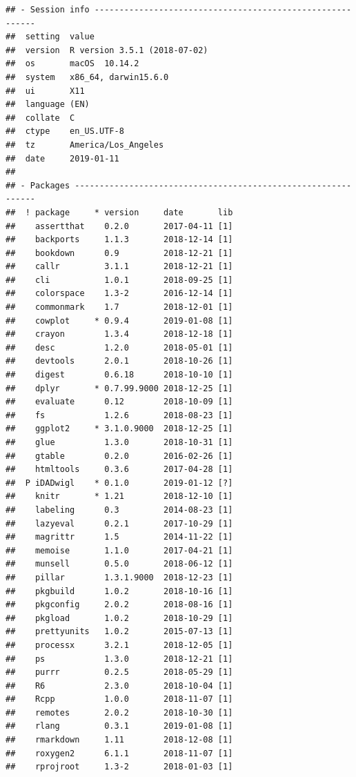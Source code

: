 \documentclass[]{elsarticle} %
\begin{document}
\begin{verbatim}
## - Session info ----------------------------------------------------------
##  setting  value                       
##  version  R version 3.5.1 (2018-07-02)
##  os       macOS  10.14.2              
##  system   x86_64, darwin15.6.0        
##  ui       X11                         
##  language (EN)                        
##  collate  C                           
##  ctype    en_US.UTF-8                 
##  tz       America/Los_Angeles         
##  date     2019-01-11                  
## 
## - Packages --------------------------------------------------------------
##  ! package     * version     date       lib
##    assertthat    0.2.0       2017-04-11 [1]
##    backports     1.1.3       2018-12-14 [1]
##    bookdown      0.9         2018-12-21 [1]
##    callr         3.1.1       2018-12-21 [1]
##    cli           1.0.1       2018-09-25 [1]
##    colorspace    1.3-2       2016-12-14 [1]
##    commonmark    1.7         2018-12-01 [1]
##    cowplot     * 0.9.4       2019-01-08 [1]
##    crayon        1.3.4       2018-12-18 [1]
##    desc          1.2.0       2018-05-01 [1]
##    devtools      2.0.1       2018-10-26 [1]
##    digest        0.6.18      2018-10-10 [1]
##    dplyr       * 0.7.99.9000 2018-12-25 [1]
##    evaluate      0.12        2018-10-09 [1]
##    fs            1.2.6       2018-08-23 [1]
##    ggplot2     * 3.1.0.9000  2018-12-25 [1]
##    glue          1.3.0       2018-10-31 [1]
##    gtable        0.2.0       2016-02-26 [1]
##    htmltools     0.3.6       2017-04-28 [1]
##  P iDADwigl    * 0.1.0       2019-01-12 [?]
##    knitr       * 1.21        2018-12-10 [1]
##    labeling      0.3         2014-08-23 [1]
##    lazyeval      0.2.1       2017-10-29 [1]
##    magrittr      1.5         2014-11-22 [1]
##    memoise       1.1.0       2017-04-21 [1]
##    munsell       0.5.0       2018-06-12 [1]
##    pillar        1.3.1.9000  2018-12-23 [1]
##    pkgbuild      1.0.2       2018-10-16 [1]
##    pkgconfig     2.0.2       2018-08-16 [1]
##    pkgload       1.0.2       2018-10-29 [1]
##    prettyunits   1.0.2       2015-07-13 [1]
##    processx      3.2.1       2018-12-05 [1]
##    ps            1.3.0       2018-12-21 [1]
##    purrr         0.2.5       2018-05-29 [1]
##    R6            2.3.0       2018-10-04 [1]
##    Rcpp          1.0.0       2018-11-07 [1]
##    remotes       2.0.2       2018-10-30 [1]
##    rlang         0.3.1       2019-01-08 [1]
##    rmarkdown     1.11        2018-12-08 [1]
##    roxygen2      6.1.1       2018-11-07 [1]
##    rprojroot     1.3-2       2018-01-03 [1]

\end{verbatim}
\end{document}
